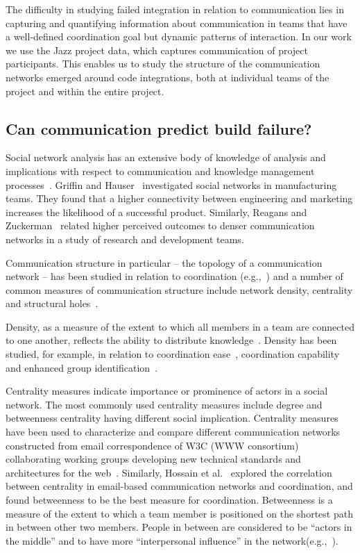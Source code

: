 The difficulty in studying failed integration in relation to communication lies
in capturing and quantifying information about communication in teams that have a
well-defined coordination goal but dynamic patterns of interaction. In our work
we use the Jazz project data, which captures communication of project
participants. This enables us to study the structure of the communication
networks emerged around code integrations, both at individual teams of the
project and within the entire project.

\subsection{Can communication predict build failure?}
\label{sec:ResearchQuestions}
Social network analysis has an extensive body of knowledge of analysis and implications with respect to communication and knowledge management
processes~\cite{Burt:1995vo,Freeman:1979rl}. Griffin and
Hauser~\cite{Griffin:1992ms} investigated social networks in manufacturing teams.
They found that a higher connectivity between engineering and marketing increases
the likelihood of a successful product. Similarly, Reagans and
Zuckerman~\cite{RayReagans:2001os} related higher perceived outcomes to denser
communication networks in a study of research and development teams.

Communication structure in particular -- the topology of a communication network
-- has been studied in relation to coordination
(e.g.,~\cite{hossain:cscw:2006,hinds:cscw:2006}) and a number of common measures of
communication structure include network density, centrality and structural
holes~\cite{Wasserman:1994sq,Freeman:1979rl}.

Density, as a measure of the extent to which all members in a team are
connected to one another, reflects the ability to distribute
knowledge~\cite{Rulke:2000ys}. Density has been studied, for example, in relation
to coordination ease~\cite{hinds:cscw:2006}, coordination
capability~\cite{hossain:cscw:2006} and enhanced group
identification~\cite{RayReagans:2001os}.

Centrality measures indicate importance or prominence of actors in a
social network. The most commonly used centrality measures include degree and
betweenness centrality having different social implication. Centrality measures
have been used to characterize and compare different communication networks
constructed from email correspondence of W3C (WWW consortium) collaborating
working groups developing new technical standards and architectures for the
web~\cite{Gloor:2003cikm}. Similarly, Hossain et al.~\cite{hossain:cscw:2006}
explored the correlation between centrality in email-based communication networks
and coordination, and found betweenness to be the best measure for coordination.
Betweenness is a measure of the extent to which a team member is
positioned on the shortest path in between other two members. People in between
are considered to be ``actors in the middle'' and to have more ``interpersonal
influence'' in the
network(e.g.,~\cite{Gloor:2003cikm,zimmermann:icse:2008,hossain:cscw:2006}).

